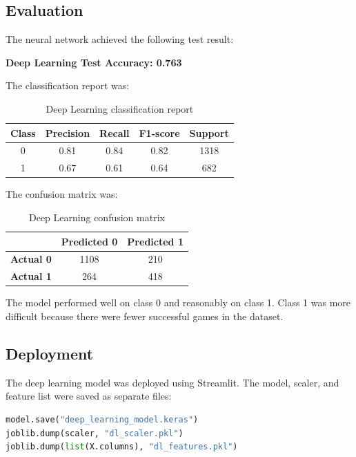 \documentclass[12pt,a4paper]{article}
\begin{document}
\subsection{Evaluation}

The neural network achieved the following test result:

\begin{center}
\textbf{Deep Learning Test Accuracy: 0.763}
\end{center}

The classification report was:

\begin{table}[H]
\centering
\begin{tabular}{ccccc}
\toprule
\textbf{Class} & \textbf{Precision} & \textbf{Recall} & \textbf{F1-score} & \textbf{Support} \\
\midrule
0 & 0.81 & 0.84 & 0.82 & 1318 \\
1 & 0.67 & 0.61 & 0.64 & 682 \\
\bottomrule
\end{tabular}
\caption{Deep Learning classification report}
\end{table}

The confusion matrix was:

\begin{table}[H]
\centering
\begin{tabular}{ccc}
\toprule
 & \textbf{Predicted 0} & \textbf{Predicted 1} \\
\midrule
\textbf{Actual 0} & 1108 & 210 \\
\textbf{Actual 1} & 264 & 418 \\
\bottomrule
\end{tabular}
\caption{Deep Learning confusion matrix}
\end{table}

The model performed well on class 0 and reasonably on class 1. Class 1 was more difficult because there were fewer successful games in the dataset.

\subsection{Deployment}

The deep learning model was deployed using Streamlit. The model, scaler, and feature list were saved as separate files:

\begin{lstlisting}[language=Python]
model.save("deep_learning_model.keras")
joblib.dump(scaler, "dl_scaler.pkl")
joblib.dump(list(X.columns), "dl_features.pkl")
\end{lstlisting}
\end{document}
